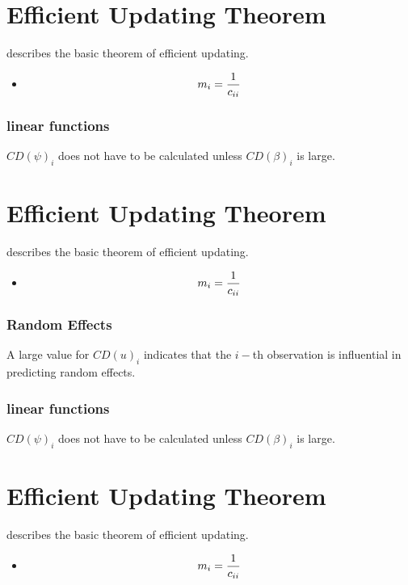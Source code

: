 \documentclass[12pt, a4paper]{article}
\begin{document}
\newpage

\section{Efficient Updating Theorem} %
\citet{Zewotir} describes the basic theorem of efficient updating.
\begin{itemize}
	\item \[ m_i = {1 \over c_{ii}}\]
\end{itemize}





\subsubsection{linear functions}


$CD(\psi)_i$ does not have to be calculated unless $CD(\beta)_i$ is large.







\section{Efficient Updating Theorem} %
\citet{Zewotir} describes the basic theorem of efficient updating.
\begin{itemize}
	\item \[ m_i = {1 \over c_{ii}}\]
\end{itemize}


\subsubsection{Random Effects}

A large value for $CD(u)_i$ indicates that the $i-$th observation is influential in predicting random effects.

\subsubsection{linear functions}

$CD(\psi)_i$ does not have to be calculated unless $CD(\beta)_i$ is large.




\section{Efficient Updating Theorem} %
\citet{Zewotir} describes the basic theorem of efficient updating.
\begin{itemize}
	\item \[ m_i = {1 \over c_{ii}}\]
\end{itemize}
\end{document}
